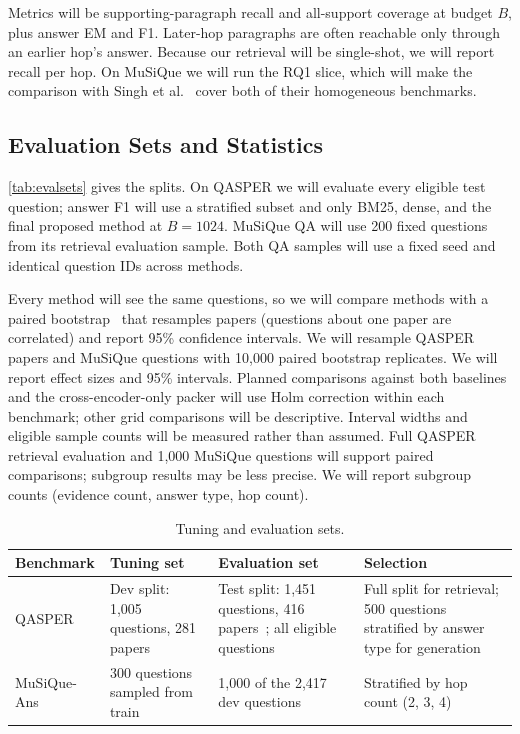 \documentclass[sigconf, nonacm]{acmart}
\begin{document}
Metrics will be supporting-paragraph recall and all-support coverage at budget $B$, plus answer EM and F1. Later-hop paragraphs are often reachable only through an earlier hop's answer. Because our retrieval will be single-shot, we will report recall per hop. On MuSiQue we will run the RQ1 slice, which will make the comparison with Singh et al.~\cite{singh2026beyond} cover both of their homogeneous benchmarks.

\subsection{Evaluation Sets and Statistics}

\autoref{tab:evalsets} gives the splits. On QASPER we will evaluate every eligible test question; answer F1 will use a stratified subset and only BM25, dense, and the final proposed method at $B=1024$. MuSiQue QA will use 200 fixed questions from its retrieval evaluation sample. Both QA samples will use a fixed seed and identical question IDs across methods.

Every method will see the same questions, so we will compare methods with a paired bootstrap~\cite{efron1993bootstrap} that resamples papers (questions about one paper are correlated) and report 95\% confidence intervals. We will resample QASPER papers and MuSiQue questions with 10,000 paired bootstrap replicates. We will report effect sizes and 95\% intervals. Planned comparisons against both baselines and the cross-encoder-only packer will use Holm correction within each benchmark; other grid comparisons will be descriptive. Interval widths and eligible sample counts will be measured rather than assumed. Full QASPER retrieval evaluation and 1,000 MuSiQue questions will support paired comparisons; subgroup results may be less precise. We will report subgroup counts (evidence count, answer type, hop count).

\begin{table}[t]
  \caption{Tuning and evaluation sets.}
  \label{tab:evalsets}
  \footnotesize
  \begin{tabularx}{\columnwidth}{P{1.3cm}YYY}
    \toprule
    Benchmark & Tuning set & Evaluation set & Selection \\
    \midrule
    QASPER & Dev split: 1,005 questions, 281 papers~\cite{dasigi2021qasper} & Test split: 1,451 questions, 416 papers~\cite{dasigi2021qasper}; all eligible questions & Full split for retrieval; 500 questions stratified by answer type for generation \\
    MuSiQue-Ans & 300 questions sampled from train & 1,000 of the 2,417 dev questions~\cite{trivedi2022musique} & Stratified by hop count (2, 3, 4) \\
    \bottomrule
  \end{tabularx}
\end{table}
\end{document}
